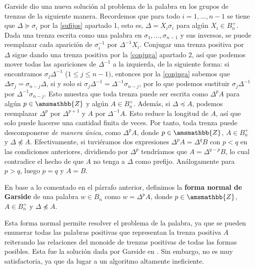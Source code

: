 \documentclass[bibtex, anon]{TEMat-article}
\newcommand{\Z}{\amsmathbb{Z}}
\begin{document}
Garside dio una nueva solución al problema de la palabra en los grupos de trenzas de la siguiente manera. Recordemos que para todo $i=1,\dots, n-1$ se tiene que $\Delta\succcurlyeq\sigma_i$ por la \cref{sufijos} apartado 1, esto es, $\Delta=X_i\sigma_i$ para algún $X_i\in B_n^+$. Dada una trenza escrita como una palabra en $\sigma_1,\dots,\sigma_{n-1}$ y sus inversos, se puede reemplazar cada aparición de $\sigma_i^{-1}$ por $\Delta^{-1}X_i$. Conjugar una trenza positiva por $\Delta$ sigue dando una trenza positiva por la \cref{conjuga} apartado 2, así que podemos mover todas las apariciones de $\Delta^{-1}$ a la izquierda, de la siguiente forma: si encontramos $\sigma_j\Delta^{-1}$ ($1\leq j\leq n-1)$, entonces por la \cref{conjuga} sabemos que $\Delta\sigma_{j}=\sigma_{n-j}\Delta$, si y solo si  $\sigma_j\Delta^{-1}=\Delta^{-1}\sigma_{n-j}$, por lo que podemos sustituir $\sigma_j\Delta^{-1}$ por $\Delta^{-1}\sigma_{n-j}$. Esto muestra que toda trenza puede ser escrita como $\Delta^p A$ para algún $p\in\Z$ y algún $A\in B_n^+$. Además, si $\Delta\preccurlyeq A$, podemos reemplazar $\Delta^p$ por $\Delta^{p+1}$ y $A$ por $\Delta^{-1}A$. Esto reduce la longitud de $A$, así que solo puede hacerse una cantidad finita de veces. Por tanto, toda trenza puede descomponerse \emph{de manera única}, como $\Delta^pA$, donde $p\in\Z$, $A\in B_n^+$ y $\Delta\not\preccurlyeq A$. Efectivamente, si tuviéramos dos expresiones $\Delta^pA=\Delta^q B$ con $p<q$ en las condiciones anteriores, dividiendo por $\Delta^p$ tendríamos que $A=\Delta^{q-p}B$, lo cual contradice el hecho de que $A$ no tenga a $\Delta$ como prefijo. Análogamente para $p>q$, luego $p=q$ y $A=B$.

\begin{definicion}
	En base a lo comentado en el párrafo anterior, definimos la \textbf{forma normal de Garside} de una palabra $w\in B_n$ como $w=\Delta^pA$, donde $p\in\Z$, $A\in B_n^+$ y $\Delta\not\preccurlyeq A$. 
\end{definicion}

Esta forma normal permite resolver el problema de la palabra, ya que se pueden enumerar todas las palabras positivas que representan la trenza positiva $A$ reiterando las relaciones del monoide de trenzas positivas de todas las formas posibles. Esta fue la solución dada por Garside en \cite{Garside}. Sin embargo, no es muy satisfactoria, ya que da lugar a un algoritmo altamente ineficiente.
\end{document}
